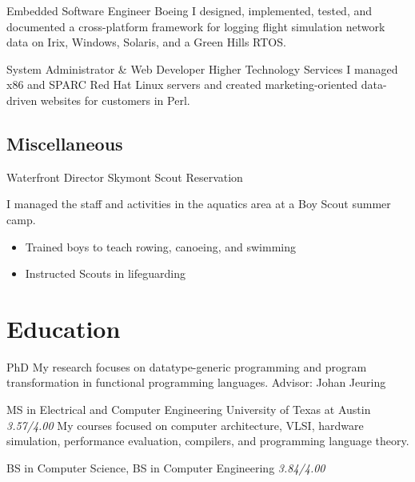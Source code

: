 \documentclass[11pt,a4paper,roman]{moderncv}
\begin{document}
\professionentry%
{}%
{Embedded Software Engineer}%
{Boeing}%
{\stlouis}%
{}%
{I designed, implemented, tested, and documented a cross-platform \Cpp framework for logging flight simulation network data on Irix, Windows, Solaris, and a Green Hills RTOS.}

\professionentry%
{}%
{System Administrator \& Web Developer}%
{Higher Technology Services}%
{\chattanooga}%
{}%
{I managed x86 and SPARC Red Hat Linux servers and created marketing-oriented data-driven websites for customers in Perl.}


\subsection{Miscellaneous}

\professionentry%
{}%
{Waterfront Director}%
{Skymont Scout Reservation}%
{\altamont}%
{}%
{I managed the staff and activities in the aquatics area at a Boy Scout summer camp.
\begin{itemize}[leftmargin=2em,nosep]
\item Trained boys to teach rowing, canoeing, and swimming
\item Instructed Scouts in lifeguarding
\end{itemize}}


\section{Education}

\educationentry%
{}%
{PhD}%
{\uu}%
{\utrecht}%
{My research focuses on datatype-generic programming and program transformation
in functional programming languages.\newline{}%
Advisor: Johan Jeuring}

\educationentrygpa%
{}%
{MS in Electrical and Computer Engineering}%
{University of Texas at Austin}%
{\austin}%
{\textit{3.57/4.00}}%
{My courses focused on computer architecture, VLSI, hardware simulation,
performance evaluation, compilers, and programming language theory.}

\educationentrygpa%
{}%
{BS in Computer Science, BS in Computer Engineering}%
{\wustl}%
{\stlouis}%
{\textit{3.84/4.00}}%
{}
\end{document}
